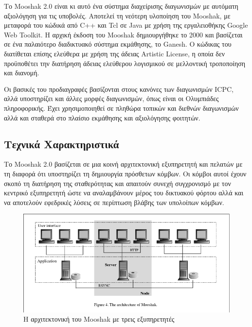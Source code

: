 \documentclass[diploma]{softlab-thesis}
\begin{document}
Το Mooshak 2.0 είναι κι αυτό ένα σύστημα διαχείρισης διαγωνισμών με αυτόματη
αξιολόγηση για τις υποβολές. Αποτελεί τη νεότερη υλοποίηση του Mooshak, με μεταφορά
του κώδικά από C++ και Tcl σε Java με χρήση της εργαλειοθήκης Google Web Toolkit.
H αρχική έκδοση του Mooshak δημιουργήθηκε το 2000 και βασίζεται σε ένα παλαιότερο
διαδικτυακό σύστημα εκμάθησης, το Ganesh. Ο κώδικας του διατίθεται επίσης ελεύθερα
με χρήση της άδειας Artistic License, η οποία δεν προϋποθέτει την διατήρηση
άδειας ελεύθερου λογισμικού σε μελλοντική τροποποίηση και διανομή.

\bigskip

Οι βασικές του προδιαγραφές βασίζονται στους κανόνες των διαγωνισμών ICPC, αλλά
υποστηρίζει και άλλες μορφές διαγωνισμών, όπως είναι οι Ολυμπιάδες πληροφορικής.
Έχει χρησιμοποιηθεί σε πληθώρα τοπικών και διεθνών διαγωνισμών αλλά και σταθερά
στο πλαίσιο εκμάθησης και αξιολόγησης φοιτητών.

\subsection{Τεχνικά Χαρακτηριστικά}

Το Mooshak 2.0 βασίζεται σε μια κοινή αρχιτεκτονική εξυπηρετητή και πελατών με τη
διαφορά ότι υποστηρίζει τη δημιουργία πρόσθετων κόμβων. Οι κόμβοι αυτοί έχουν σκοπό
τη διατήρηση της σταθερότητας και απαιτούν συνεχή συγχρονισμό με τον κεντρικό
εξυπηρετητή ώστε να αναλαμβάνουν μέρος του δικτυακού φόρτου αλλά και να αποτελούν
εφεδρικές λύσεις σε περίπτωση βλάβης των υπολοίπων κόμβων.

\bigskip

\begin{figure}
  \centering
  \includegraphics[scale=0.4,trim=4 4 4 4,clip]{Figures/mooshakarchitecture.png}
  \caption[Η αρχιτεκτονική του Mooshak]{Η αρχιτεκτονική του Mooshak με τρεις εξυπηρετητές}
\end{figure}
\end{document}
